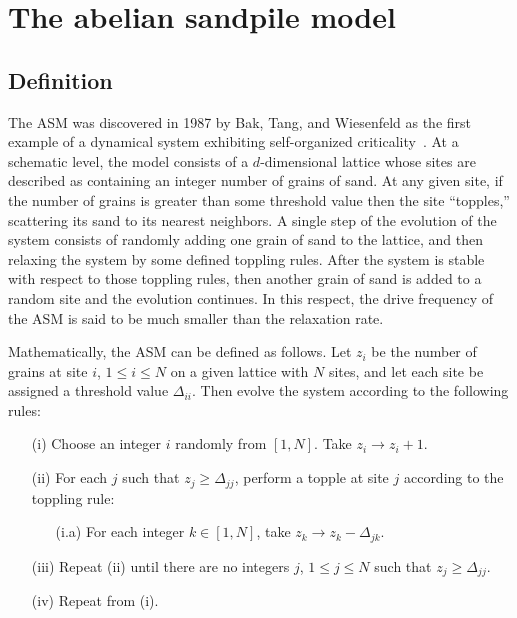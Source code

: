 \documentclass[aps,prb,reprint,superscriptaddress]{revtex4-2}
\begin{document}
\section{The abelian sandpile model}

\subsection{Definition\label{sec:rules}}

The ASM was discovered in 1987 by Bak, Tang, and Wiesenfeld as the first example of a dynamical system exhibiting self-organized criticality~\cite{bak_self-organized_1987}. At a schematic level, the model consists of a $d$-dimensional lattice whose sites are described as containing an integer number of grains of sand. At any given site, if the number of grains is greater than some threshold value then the site ``topples,'' scattering its sand to its nearest neighbors. A single step of the evolution of the system consists of randomly adding one grain of sand to the lattice, and then relaxing the system by some defined toppling rules. After the system is stable with respect to those toppling rules, then another grain of sand is added to a random site and the evolution continues. In this respect, the drive frequency of the ASM is said to be much smaller than the relaxation rate.

Mathematically, the ASM can be defined as follows. Let $z_i$ be the number of grains at site $i$, $1 \leq i \leq N$ on a given lattice with $N$ sites, and let each site be assigned a threshold value $\Delta_{ii}$. Then evolve the system according to the following rules:

\begin{enumerate}
\item[(i)] Choose an integer $i$ randomly from $[1, N]$. Take $z_i \rightarrow z_i+1$.
\item[(ii)] For each $j$ such that $z_j \geq \Delta_{jj}$, perform a topple at site $j$ according to the toppling rule:
\begin{enumerate}
\item[(i.a)] For each integer $k \in [1, N]$, take $z_k \rightarrow z_k - \Delta_{jk}$.
\end{enumerate}
\item[(iii)] Repeat (ii) until there are no integers $j$, $1 \leq j \leq N$ such that $z_j \geq \Delta_{jj}$.
\item[(iv)] Repeat from (i).
\end{enumerate}
\end{document}
